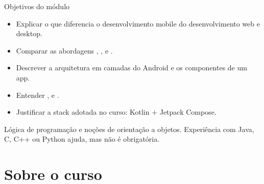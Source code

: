 \documentclass[aspectratio=169,10pt]{beamer}
\begin{document}
\capa

\begin{frame}{Objetivos do módulo}
  \begin{conceito}
    \begin{itemize}
      \item Explicar o que diferencia o desenvolvimento mobile do desenvolvimento web e desktop.
      \item Comparar as abordagens , ,  e .
      \item Descrever a arquitetura em camadas do Android e os componentes de um app.
      \item Entender ,  e .
      \item Justificar a stack adotada no curso: Kotlin + Jetpack Compose.
    \end{itemize}
  \end{conceito}
  \begin{dica}
    Lógica de programação e noções de orientação a objetos. Experiência com Java, C, C++ ou Python ajuda, mas não é obrigatória.
  \end{dica}
\end{frame}

\sumario

\section{Sobre o curso}
\end{document}
